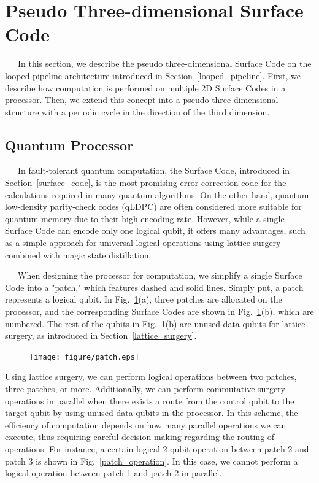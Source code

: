 \documentclass[a4paper,11pt]{ltjsarticle}
\begin{document}
\section{Pseudo Three-dimensional Surface Code}{
    \ \ \ In this section, we describe the pseudo three-dimensional Surface Code on the looped pipeline architecture introduced in Section~\ref{looped_pipeline}. First, we describe how computation is performed on multiple 2D Surface Codes in a processor. Then, we extend this concept into a pseudo three-dimensional structure with a periodic cycle in the direction of the third dimension.

    \subsection{Quantum Processor}{
        \ \ \ In fault-tolerant quantum computation, the Surface Code, introduced in Section~\ref{surface_code}, is the most promising error correction code for the calculations required in many quantum algorithms. On the other hand, quantum low-density parity-check codes (qLDPC) are often considered more suitable for quantum memory due to their high encoding rate. However, while a single Surface Code can encode only one logical qubit, it offers many advantages, such as a simple approach for universal logical operations using lattice surgery combined with magic state distillation.

        \ \ \ When designing the processor for computation, we simplify a single Surface Code into a "patch," which features dashed and solid lines. Simply put, a patch represents a logical qubit. In Fig.~\ref{patch}(a), three patches are allocated on the processor, and the corresponding Surface Codes are shown in Fig.~\ref{patch}(b), which are numbered. The rest of the qubits in Fig.~\ref{patch}(b) are unused data qubits for lattice surgery, as introduced in Section~\ref{lattice_surgery}.
        \begin{figure}[h]
            \centering
            \texttt{[image: figure/patch.eps]}
            \vspace{0pt}\caption{}
            \label{patch}
            \vspace{-10pt}
        \end{figure}

        \clearpage

        Using lattice surgery, we can perform logical operations between two patches, three patches, or more. Additionally, we can perform commutative surgery operations in parallel when there exists a route from the control qubit to the target qubit by using unused data qubits in the processor. In this scheme, the efficiency of computation depends on how many parallel operations we can execute, thus requiring careful decision-making regarding the routing of operations. For instance, a certain logical 2-qubit operation between patch 2 and patch 3 is shown in Fig.~\ref{patch_operation}. In this case, we cannot perform a logical operation between patch 1 and patch 2 in parallel.

}}
\end{document}

